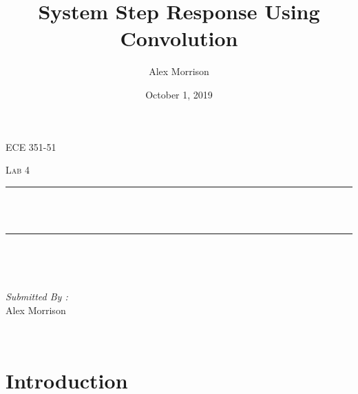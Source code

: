 \documentclass[12pt]{report}
\title{System Step Response Using Convolution}
\author{ Alex Morrison}
\date{October 1, 2019}
\makeatletter
\let\thetitle\@title
\makeatother
\begin{document}

\begin{titlepage}
	\centering
    \vspace*{0.5 cm}
\begin{center}    \textsc{\Large ECE 351-51}\\[2.0 cm]	\end{center}%
	\textsc{\Large  Lab 4}\\[0.5 cm]				%
	\rule{\linewidth}{0.2 mm} \\[0.4 cm]
	{ \huge \bfseries \thetitle}\\
	\rule{\linewidth}{0.2 mm} \\[1.5 cm]
	
	\begin{minipage}{0.4\textwidth}
		\begin{flushleft} \large
			\end{flushleft}
			\end{minipage}~
			\begin{minipage}{0.4\textwidth}
            
			\begin{flushright} \large
			\emph{Submitted By :} \\
			Alex Morrison  
		\end{flushright}
           
	\end{minipage}\\[2 cm]
	

    
    
    
    
	
\end{titlepage}


\tableofcontents
\pagebreak

\renewcommand{\thesection}{\arabic{section}}
\section{Introduction}
 
\end{document}
